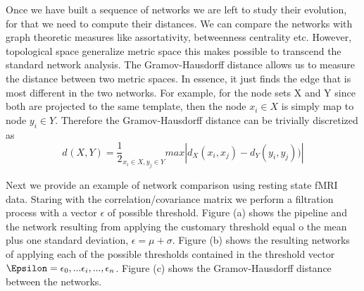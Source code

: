 \documentclass[onecollarge,runningheads]{svjour2}
\begin{document}
Once we have built a sequence of networks we are left to study their evolution, for that we need to compute their distances. We can compare the networks with graph theoretic measures like assortativity, betweenness centrality etc. However, topological space generalize metric space this makes possible to transcend the standard network analysis.
The Gramov-Hausdorff distance allows us to measure the distance between two metric spaces. In essence, it just finds the edge that is most different in the two networks. For example, for the node sets X and Y since both are projected to the same template, then the node $x_i \in X$ is simply map to node $y_i \in Y$. Therefore the Gramov-Hausdorff  distance can be trivially discretized as 
\begin{equation}
d_{}(X,Y) = \frac{1}{2}_{x_i \in X, y_j \in Y} max |d_X(x_i,x_j) - d_Y(y_i,y_j))|
\end{equation} 

Next we provide an example of network comparison using resting state fMRI data. 
Staring with the correlation/covariance matrix we perform a filtration process with a vector $\epsilon$ of possible threshold. Figure (a) shows the pipeline and the network resulting from applying the customary threshold equal o the mean plus one standard deviation, $\epsilon=\mu +\sigma$. 
Figure (b) shows the resulting networks of applying each of the possible thresholds contained in the threshold vector $\Epsilon= \epsilon_0,... \epsilon_i, ..., \epsilon_n$. Figure (c) shows the Gramov-Hausdorff distance between the networks. %
\end{document}
